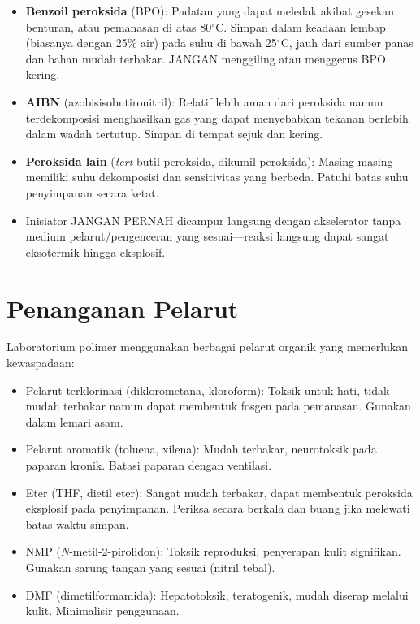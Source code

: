 \documentclass[12pt,a4paper,openany]{book}
\begin{document}
\begin{itemize}
\item \textbf{Benzoil peroksida} (BPO): Padatan yang dapat meledak akibat gesekan, benturan, atau pemanasan di atas 80$^{\circ}$C. Simpan dalam keadaan lembap (biasanya dengan 25\% air) pada suhu di bawah 25$^{\circ}$C, jauh dari sumber panas dan bahan mudah terbakar. JANGAN menggiling atau menggerus BPO kering.
\item \textbf{AIBN} (azobisisobutironitril): Relatif lebih aman dari peroksida namun terdekomposisi menghasilkan gas  yang dapat menyebabkan tekanan berlebih dalam wadah tertutup. Simpan di tempat sejuk dan kering.
\item \textbf{Peroksida lain} (\textit{tert}-butil peroksida, dikumil peroksida): Masing-masing memiliki suhu dekomposisi dan sensitivitas yang berbeda. Patuhi batas suhu penyimpanan secara ketat.
\item Inisiator JANGAN PERNAH dicampur langsung dengan akselerator tanpa medium pelarut/pengenceran yang sesuai---reaksi langsung dapat sangat eksotermik hingga eksplosif.
\end{itemize}

\section*{Penanganan Pelarut}

Laboratorium polimer menggunakan berbagai pelarut organik yang memerlukan kewaspadaan:

\begin{itemize}
\item Pelarut terklorinasi (diklorometana, kloroform): Toksik untuk hati, tidak mudah terbakar namun dapat membentuk fosgen pada pemanasan. Gunakan dalam lemari asam.
\item Pelarut aromatik (toluena, xilena): Mudah terbakar, neurotoksik pada paparan kronik. Batasi paparan dengan ventilasi.
\item Eter (THF, dietil eter): Sangat mudah terbakar, dapat membentuk peroksida eksplosif pada penyimpanan. Periksa secara berkala dan buang jika melewati batas waktu simpan.
\item NMP (\textit{N}-metil-2-pirolidon): Toksik reproduksi, penyerapan kulit signifikan. Gunakan sarung tangan yang sesuai (nitril tebal).
\item DMF (dimetilformamida): Hepatotoksik, teratogenik, mudah diserap melalui kulit. Minimalisir penggunaan.
\end{itemize}
\end{document}
